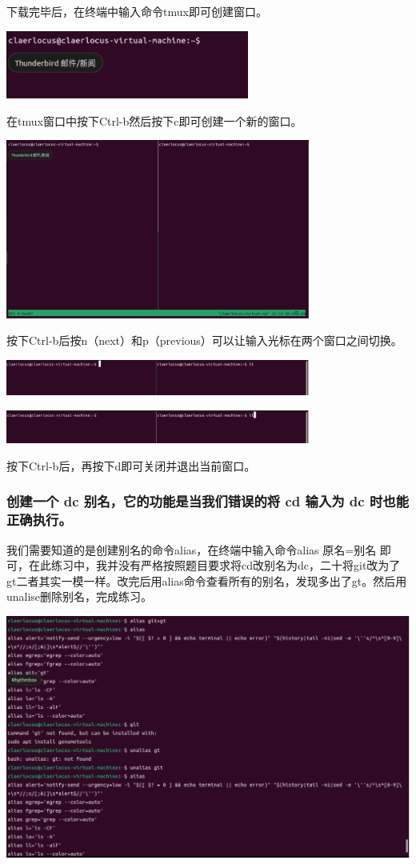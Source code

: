 \documentclass[UTF8,a4paper]{ctexart}
\begin{document}
\begin{sloppypar}
	下载完毕后，在终端中输入命令tmux即可创建窗口。

	\includegraphics[width = 8cm]{6}

	在tmux窗口中按下Ctrl-b然后按下c即可创建一个新的窗口。
	
	\includegraphics[width = 10cm]{7}
	
	按下Ctrl-b后按n（next）和p（previous）可以让输入光标在两个窗口之间切换。
	
	\includegraphics[width = 10cm]{8}
	
	\includegraphics[width = 10cm]{9}
	
	按下Ctrl-b后，再按下d即可关闭并退出当前窗口。
	
	\subsubsection{创建一个 dc 别名，它的功能是当我们错误的将 cd 输入为 dc 时也能正确执行。}
	
	我们需要知道的是创建别名的命令alias，在终端中输入命令alias 原名=别名 即可，在此练习中，我并没有严格按照题目要求将cd改别名为dc，二十将git改为了gt二者其实一模一样。改完后用alias命令查看所有的别名，发现多出了gt。然后用unalise删除别名，完成练习。

	\includegraphics[width = 14cm]{10}


\end{sloppypar}
\end{document}
